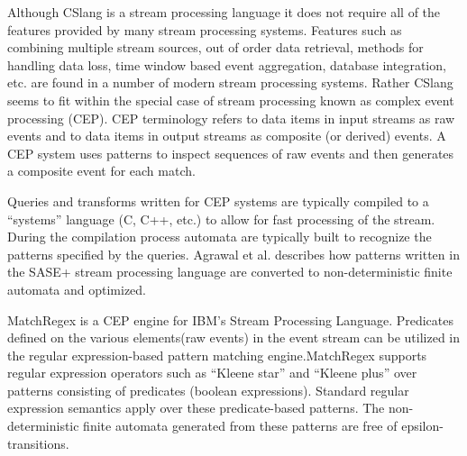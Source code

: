 Although CSlang is a stream processing language it does not
require all of the features provided by many stream processing systems. Features
such as combining multiple stream sources, out of order data retrieval, methods
for handling data loss, time window based event aggregation, database
integration, etc. are found in a number of modern stream processing
systems\cite{DBLP:journals/csur/DayarathnaP18}.   Rather CSlang seems to fit within the special case of
stream processing known as complex event processing (CEP). CEP terminology refers
to data items in input streams as raw events and to data items in output streams
as composite (or derived) events. A CEP system uses patterns to inspect
sequences of raw events and then generates a composite event for each
match\cite{DBLP:journals/ibmrd/HirzelAGJKKMNSSW13}.

Queries and transforms written for CEP systems are
typically compiled to a “systems” language (C, C++, etc.) to allow for fast
processing of the stream. During the compilation process automata are typically
built to recognize the patterns specified by the queries. Agrawal et
al.\cite{DBLP:conf/sigmod/AgrawalDGI08} describes how patterns written in the SASE+ stream
processing language are converted to non-deterministic finite automata and
optimized.

MatchRegex\cite{DBLP:conf/debs/Hirzel12} is a CEP engine for IBM’s Stream Processing
Language. Predicates defined on the various elements(raw events) in the event
stream can be utilized in the regular expression-based pattern matching
engine.MatchRegex supports regular expression operators such as “Kleene star”
and “Kleene plus” over patterns consisting of predicates (boolean expressions).
Standard regular expression semantics apply over these predicate-based patterns.
The non-deterministic finite automata generated from these patterns are free of
epsilon-transitions.

